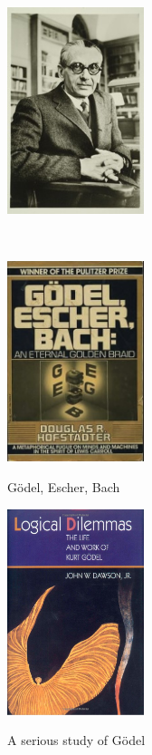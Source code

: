 \begin{frame}
\begin{minipage}{5cm}
\includegraphics[width=4cm]{figures/KurtGodel.jpg}
\end{minipage}
\begin{minipage}{5cm}
 \\
\end{minipage}
\end{frame}

\begin{frame}
\begin{minipage}{5cm}
\includegraphics[width=4cm]{figures/geb.jpg}
\end{minipage}
\begin{minipage}{5cm}
G{\"o}del, Escher, Bach \\
\end{minipage}
\end{frame}

\begin{frame}
\begin{minipage}{5cm}
\includegraphics[width=4cm]{figures/logicaldilemmas.png}
\end{minipage}
\begin{minipage}{5cm}
A serious study of G{\"o}del \\
\end{minipage}
\end{frame}


